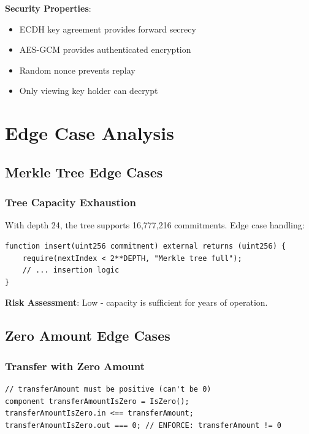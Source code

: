\documentclass[11pt,a4paper]{article}
\begin{document}
\textbf{Security Properties}:
\begin{itemize}
    \item ECDH key agreement provides forward secrecy
    \item AES-GCM provides authenticated encryption
    \item Random nonce prevents replay
    \item Only viewing key holder can decrypt
\end{itemize}

\section{Edge Case Analysis}

\subsection{Merkle Tree Edge Cases}

\subsubsection{Tree Capacity Exhaustion}

With depth 24, the tree supports 16,777,216 commitments. Edge case handling:

\begin{lstlisting}[style=solidity, caption={Capacity Check (TokenPool.sol concept)}]
function insert(uint256 commitment) external returns (uint256) {
    require(nextIndex < 2**DEPTH, "Merkle tree full");
    // ... insertion logic
}
\end{lstlisting}

\textbf{Risk Assessment}: Low - capacity is sufficient for years of operation.

\subsection{Zero Amount Edge Cases}

\subsubsection{Transfer with Zero Amount}

\begin{lstlisting}[style=circom, caption={Non-Zero Transfer Enforcement (transfer.circom:87-90)}]
// transferAmount must be positive (can't be 0)
component transferAmountIsZero = IsZero();
transferAmountIsZero.in <== transferAmount;
transferAmountIsZero.out === 0; // ENFORCE: transferAmount != 0
\end{lstlisting}
\end{document}
